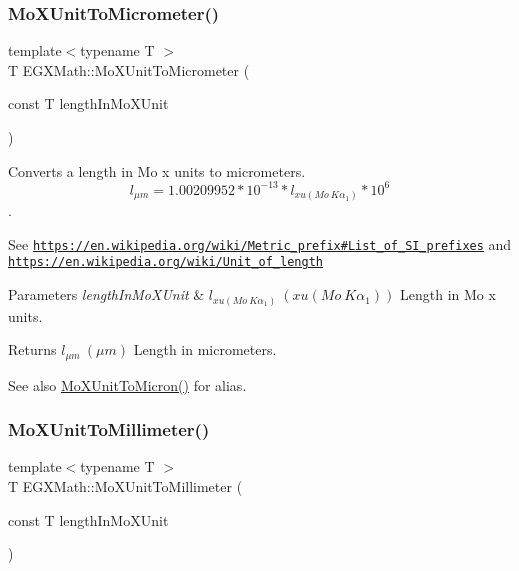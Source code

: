 \subsubsection{\texorpdfstring{Mo\+X\+Unit\+To\+Micrometer()}{MoXUnitToMicrometer()}}
{\footnotesize\ttfamily template$<$typename T $>$ \\
T E\+G\+X\+Math\+::\+Mo\+X\+Unit\+To\+Micrometer (\begin{DoxyParamCaption}\item[{const T}]{length\+In\+Mo\+X\+Unit }\end{DoxyParamCaption})}



Converts a length in Mo x units to micrometers. \[ l_{\mu m}=1.00209952*10^{-13} * l_{xu(Mo\ K\alpha_1)} * 10^{6} \]. 

See \href{https://en.wikipedia.org/wiki/Metric_prefix#List_of_SI_prefixes}{\tt https\+://en.\+wikipedia.\+org/wiki/\+Metric\+\_\+prefix\#\+List\+\_\+of\+\_\+\+S\+I\+\_\+prefixes} and \href{https://en.wikipedia.org/wiki/Unit_of_length}{\tt https\+://en.\+wikipedia.\+org/wiki/\+Unit\+\_\+of\+\_\+length} 
\begin{DoxyParams}{Parameters}
{\em length\+In\+Mo\+X\+Unit} & $ l_{xu(Mo\ K\alpha_1)}\ (xu(Mo\ K\alpha_1))$ Length in Mo x units. \\
\hline
\end{DoxyParams}
\begin{DoxyReturn}{Returns}
$ l_{\mu m}\ (\mu m)$ Length in micrometers. 
\end{DoxyReturn}
\begin{DoxySeeAlso}{See also}
\mbox{\hyperlink{group___e_g_x_math-_conversions-_length_conversions-_non-_s_i-_mo_x_unit-_non-_s_i_ga8fa37a1f86f7b01d2ca395fb7d2b75ce}{Mo\+X\+Unit\+To\+Micron()}} for alias. 
\end{DoxySeeAlso}
\mbox{\label{group___e_g_x_math-_conversions-_length_conversions-_non-_s_i-_mo_x_unit-_s_i_gacc95302aafadf7f38b9952f6a73c1279}} 
\subsubsection{\texorpdfstring{Mo\+X\+Unit\+To\+Millimeter()}{MoXUnitToMillimeter()}}
{\footnotesize\ttfamily template$<$typename T $>$ \\
T E\+G\+X\+Math\+::\+Mo\+X\+Unit\+To\+Millimeter (\begin{DoxyParamCaption}\item[{const T}]{length\+In\+Mo\+X\+Unit }\end{DoxyParamCaption})}




